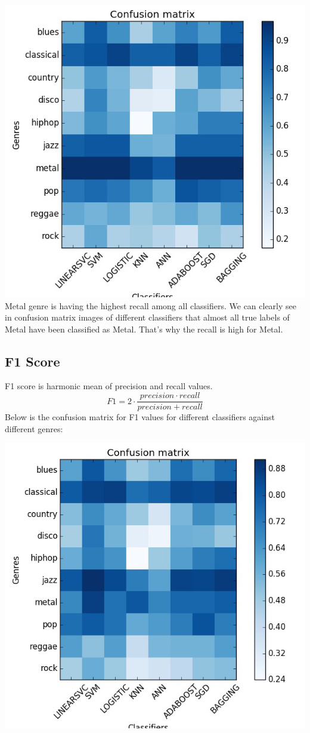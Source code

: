 \documentclass[conference]{IEEEtran}
\begin{document}
\includegraphics[width=\columnwidth]{recall}
Metal genre is having the highest recall among all classifiers. We can clearly see in confusion matrix images of different classifiers that almost all true labels of Metal have been classified as Metal. That's why the recall is high for Metal.
\subsection{F1 Score}
F1 score is harmonic mean of precision and recall values.
\begin{equation}
    F1=2 \cdot\frac{precision\cdot recall}{precision + recall}
\end{equation}
Below is the confusion matrix for F1 values for different classifiers against different genres:

\includegraphics[width=\columnwidth]{f1score}
\end{document}
